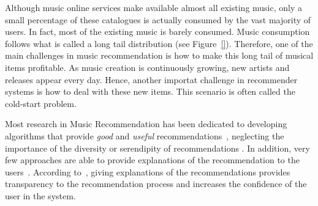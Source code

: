Although music online services make available almost all existing music, only a small percentage of these catalogues is actually consumed by the vast majority of users. In fact, most of the existing music is barely consumed. Music consumption follows what is called a long tail distribution \cite{oscarBook} (see Figure~\ref{}). Therefore, one of the main challenges in music recommendation is how to make this long tail of musical items profitable. As music creation is continuously growing, new artists and releases appear every day. Hence, another importat challenge in recommender systems is how to deal with these new items. This scenario is often called the cold-start problem.

Most research in Music Recommendation has been dedicated to developing algorithms that provide \textit{good} and \textit{useful} recommendations~\cite{oscarBook}, neglecting the importance of the diversity or serendipity of recommendations \cite{TODO}. In addition, very few approaches are able to provide explanations of the recommendation to the users~\cite{Passant2008, Passant2010}. According to~\cite{celma2008new}, giving explanations of the recommendations provides transparency to the recommendation process and increases the confidence of the user in the system.





